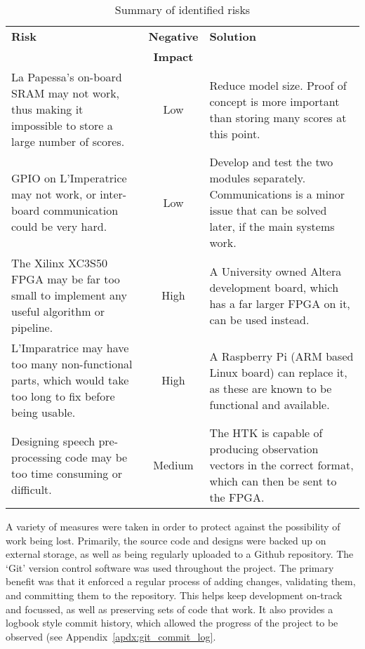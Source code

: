 	\begin{table}[tb]
		\caption{Summary of identified risks}
		\label{tab:risks}
		\begin{center}
			\begin{tabular}{ p{} | c | p{}}
			\hline
			\hline
			\textbf{Risk} & \textbf{Negative} & \textbf{Solution}
			\\            & \textbf{Impact}   & \\
			\hline
				La Papessa's on-board SRAM may not work, thus making it impossible to store a large number of scores.
					& Low
					& Reduce model size. Proof of concept is more important than storing many scores at this point.
					\\ \hline
				GPIO on L'Imperatrice may not work, or inter-board communication could be very hard.
					& Low
					& Develop and test the two modules separately.  Communications is a minor issue that can be solved later, if the main systems work.
					\\ \hline
				The Xilinx XC3S50 FPGA may be far too small to implement any useful algorithm or pipeline.
					& High
					& A University owned Altera development board, which has a far larger FPGA on it, can be used instead.
					\\ \hline
				L'Imparatrice may have too many non-functional parts, which would take too long to fix before being usable.
					& High
					& A Raspberry Pi (ARM based Linux board) can replace it, as these are known to be functional and available.
					\\ \hline
				Designing speech pre-processing code may be too time consuming or difficult.
					& Medium
					& The HTK is capable of producing observation vectors in the correct format, which can then be sent to the FPGA.
					\\
			\hline
			\hline
			\end{tabular}
		\end{center}
	\end{table}

	A variety of measures were taken in order to protect against the possibility of work being lost.  Primarily, the source code and designs were backed up on external storage, as well as being regularly uploaded to a Github repository.  The `Git' version control software was used throughout the project.  The primary benefit was that it enforced a regular process of adding changes, validating them, and committing them to the repository.  This helps keep development on-track and focussed, as well as preserving sets of code that work.  It also provides a logbook style commit history, which allowed the progress of the project to be observed (see Appendix~\ref{apdx:git_commit_log}.

